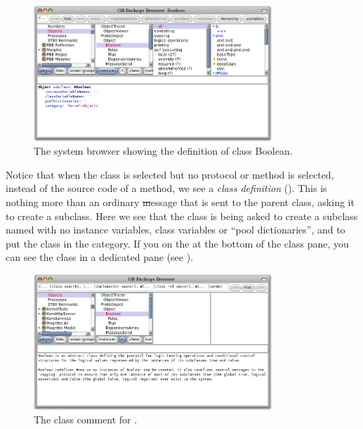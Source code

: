 \documentclass[a4paper,10pt,twoside]{book}
\begin{document}
\begin{figure}[hbt]
\centerline {\includegraphics[width=0.8\textwidth]{Kernel-objects-boolean}}
\caption{The system browser showing the definition of class Boolean.
\label{fig:browseBoolean}}
\end{figure}

Notice that when the  class is selected but no protocol or method is selected, instead of the source code of a method, we see a \emph{class definition} ().
This is nothing more than an ordinary \st message that is sent to the parent class, asking it to create a subclass.
Here we see that the class  is being asked to create a subclass named  with no instance variables, class variables or ``pool dictionaries'', and to put the class  in the  category.
If you \click on the  at the bottom of the class pane, you can see the class  in a dedicated pane (see ).

\begin{figure}[hbt]
\centerline {\includegraphics[width=0.8\textwidth]{classComment}}
\caption{The class comment for .
\label{fig:classComment}}
\end{figure}
\end{document}
